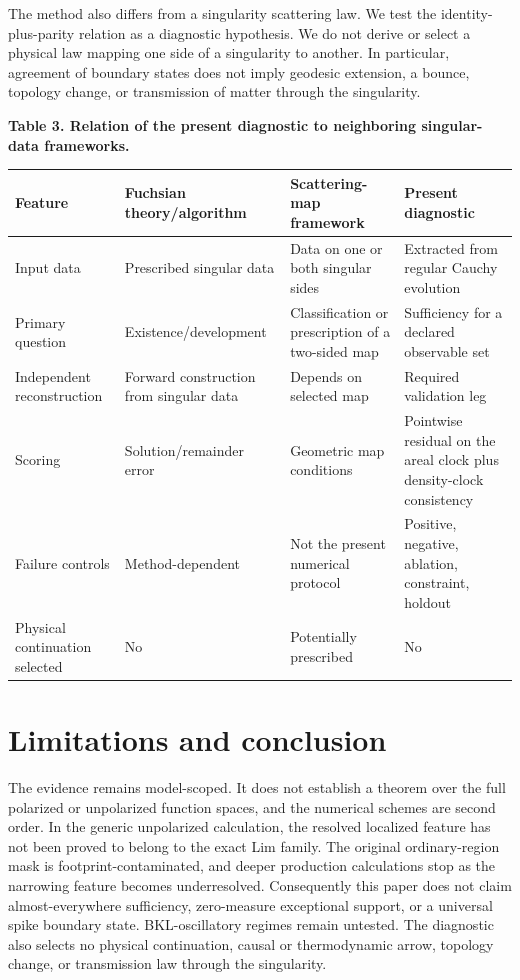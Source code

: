 \documentclass{iopjournal}
\begin{document}
The method also differs from a singularity scattering law. We test the identity-plus-parity relation as a diagnostic hypothesis. We do not derive or select a physical law mapping one side of a singularity to another. In particular, agreement of boundary states does not imply geodesic extension, a bounce, topology change, or transmission of matter through the singularity.

\textbf{Table 3. Relation of the present diagnostic to neighboring singular-data frameworks.}

\begin{table}[H]
\centering
\small
\begin{tabularx}{\textwidth}{@{}lYYY@{}}
\toprule
\textbf{Feature} & \textbf{Fuchsian theory/algorithm} & \textbf{Scattering-map framework} & \textbf{Present diagnostic} \\
\midrule
Input data & Prescribed singular data & Data on one or both singular sides & Extracted from regular Cauchy evolution \\
Primary question & Existence/development & Classification or prescription of a two-sided map & Sufficiency for a declared observable set \\
Independent reconstruction & Forward construction from singular data & Depends on selected map & Required validation leg \\
Scoring & Solution/remainder error & Geometric map conditions & Pointwise residual on the areal clock plus density-clock consistency \\
Failure controls & Method-dependent & Not the present numerical protocol & Positive, negative, ablation, constraint, holdout \\
Physical continuation selected & No & Potentially prescribed & No \\
\bottomrule
\end{tabularx}
\end{table}
\section{Limitations and conclusion}
The evidence remains model-scoped. It does not establish a theorem over the full polarized or unpolarized function spaces, and the numerical schemes are second order. In the generic unpolarized calculation, the resolved localized feature has not been proved to belong to the exact Lim family. The original ordinary-region mask is footprint-contaminated, and deeper production calculations stop as the narrowing feature becomes underresolved. Consequently this paper does not claim almost-everywhere sufficiency, zero-measure exceptional support, or a universal spike boundary state. BKL-oscillatory regimes remain untested. The diagnostic also selects no physical continuation, causal or thermodynamic arrow, topology change, or transmission law through the singularity.
\end{document}
